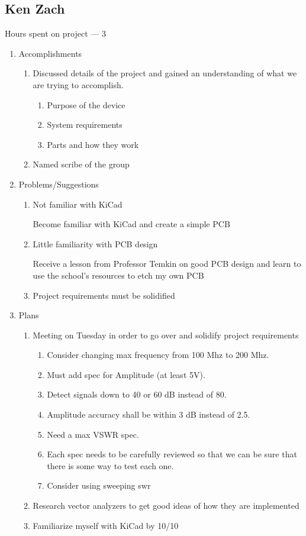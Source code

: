 \documentclass{article}
\begin{document}
\subsection*{Ken Zach}
Hours spent on project --- 3

\begin{enumerate}
\item{Accomplishments
    \begin{enumerate}
    \item{Discussed details of the project and gained an understanding of what we are trying to accomplish.
        \begin{enumerate}
        \item{Purpose of the device}
        \item{System requirements}
        \item{Parts and how they work}
        \end{enumerate}
    }
    \item{Named scribe of the group}
    \end{enumerate}
}
\item{Problems/Suggestions
\begin{enumerate}
\item{Not familiar with KiCad

Become familiar with KiCad and create a simple PCB}
\item{Little familiarity with PCB design

Receive a lesson from Professor Temkin on good PCB design and learn to use the school's resources to etch my own PCB}
\item{Project requirements must be solidified}
\end{enumerate}
}
\item{Plans
\begin{enumerate}
\item{Meeting on Tuesday in order to go over and solidify project requirements
    \begin{enumerate}
    \item{Consider changing max frequency from 100 Mhz to 200 Mhz.}
    \item{Must add spec for Amplitude (at least 5V).}
    \item{Detect signals down to 40 or 60 dB instead of 80.}
    \item{Amplitude accuracy shall be within 3 dB instead of 2.5.}
    \item{Need a max VSWR spec.}
    \item{Each spec needs to be carefully reviewed so that we can be sure that there is some way to test each one.}
    \item{Consider using sweeping swr}
    \end{enumerate}
}
\item{Research vector analyzers to get good ideas of how they are implemented}
\item{Familiarize myself with KiCad by 10/10}
\end{enumerate}
}
\end{enumerate}
\end{document}
